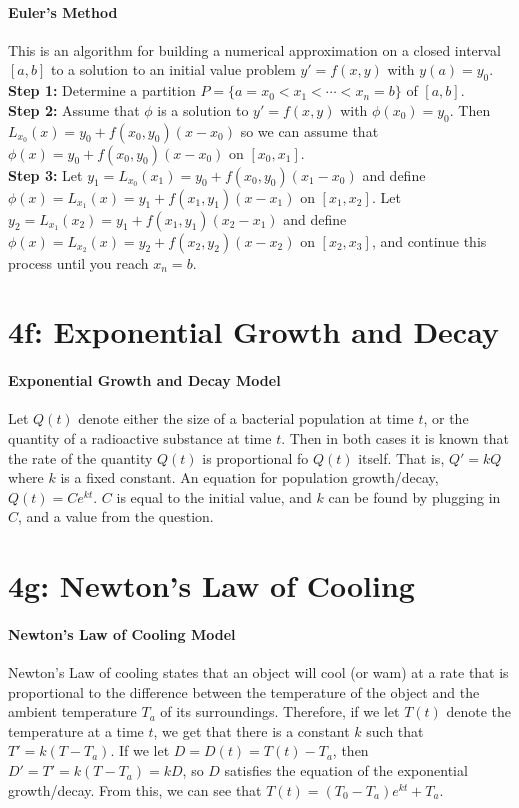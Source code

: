 \documentclass[10pt,letter]{article}
\begin{document}
\paragraph{Euler's Method}
This is an algorithm for building a numerical approximation on a closed interval $[a,b]$ to a solution to an initial value problem $y'=f(x,y)$ with $y(a)=y_0$. \\
\textbf{Step 1:} Determine a partition $P=\{a=x_0<x_1<\cdots<x_n=b\}$ of $[a,b]$.\\ 
\textbf{Step 2:} Assume that $\phi$ is a solution to $y'=f(x,y)$ with $\phi(x_0)=y_0$. Then $L_{x_0}(x)=y_0+f(x_0,y_0)(x-x_0)$ so we can assume that $\phi(x)=y_0+f(x_0,y_0)(x-x_0)$ on $[x_0,x_1]$. \\
\textbf{Step 3:} Let $y_1=L_{x_0}(x_1)=y_0+f(x_0,y_0)(x_1-x_0)$ and define $\phi(x)=L_{x_1}(x)=y_1+f(x_1,y_1)(x-x_1)$ on $[x_1,x_2]$. Let $y_2=L_{x_1}(x_2)=y_1+f(x_1,y_1)(x_2-x_1)$ and define $\phi(x)=L_{x_2}(x)=y_2+f(x_2,y_2)(x-x_2)$ on $[x_2,x_3]$, and continue this process until you reach $x_n=b$. 

\section*{4f: Exponential Growth and Decay}
\paragraph{Exponential Growth and Decay Model}
Let $Q(t)$ denote either the size of a bacterial population at time $t$, or the quantity of a radioactive substance at time $t$. Then in both cases it is known that the rate of the quantity $Q(t)$ is proportional fo $Q(t)$ itself. That is, $Q'=kQ$ where $k$ is a fixed constant. An equation for population growth/decay, $Q(t)=Ce^{kt}$. $C$ is equal to the initial value, and $k$ can be found by plugging in $C$, and a value from the question. 

\section*{4g: Newton's Law of Cooling}
\paragraph{Newton's Law of Cooling Model}
Newton's Law of cooling states that an object will cool (or wam) at a rate that is proportional to the difference between the temperature of the object and the ambient temperature $T_a$ of its surroundings. Therefore, if we let $T(t)$ denote the temperature at a time $t$, we get that there is a constant $k$ such that $T'=k(T-T_a)$. If we let $D=D(t)=T(t)-T_a$, then $D'=T'=k(T-T_a)=kD$, so $D$ satisfies the equation of the exponential growth/decay. From this, we can see that $T(t)=(T_0-T_a)e^{kt}+T_a$.
\end{document}
